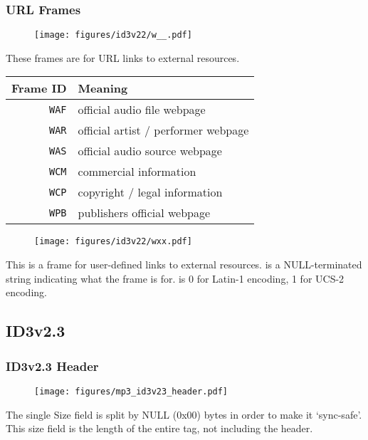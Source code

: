 \subsubsection{URL Frames}
\begin{figure}[h]
\texttt{[image: figures/id3v22/w\_\_.pdf]}
\end{figure}
These frames are for URL links to external resources.
\par
\begin{table}[h]
\begin{tabular}{|r|l|}
\hline
Frame ID & Meaning \\
\hline
\texttt{WAF} & official audio file webpage \\
\texttt{WAR} & official artist / performer webpage \\
\texttt{WAS} & official audio source webpage \\
\texttt{WCM} & commercial information \\
\texttt{WCP} & copyright / legal information \\
\texttt{WPB} & publishers official webpage \\
\hline
\end{tabular}
\end{table}
\begin{figure}[h]
\texttt{[image: figures/id3v22/wxx.pdf]}
\end{figure}
This is a frame for user-defined links to external resources.
 is a NULL-terminated string indicating
what the frame is for.
 is 0 for Latin-1 encoding, 1 for UCS-2 encoding.

\clearpage

\subsection{ID3v2.3}
\subsubsection{ID3v2.3 Header}
\begin{figure}[h]
\texttt{[image: figures/mp3\_id3v23\_header.pdf]}
\end{figure}
\par
\noindent
The single Size field is split by NULL (0x00) bytes in order to make
it `sync-safe'.
This size field is the length of the entire tag, not including the header.

